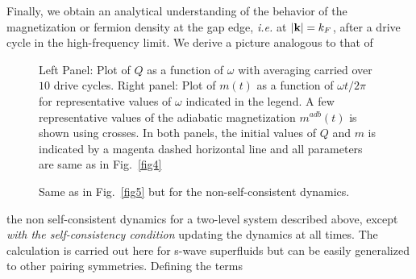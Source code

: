 \documentclass[a4paper,10pt]{report}
\begin{document}
Finally, we obtain an analytical understanding of the
behavior of the magnetization or fermion density at the gap edge,
{\it i.e.} at $|{\bf k}|= k_F$, after a drive cycle in the
high-frequency limit. We derive a picture analogous to that of 
\begin{figure}
\begin{center}
\end{center}
\caption{  Left Panel: Plot of $Q$ as a function of
$\omega$ with averaging carried over $10$ drive cycles. Right panel:
Plot of $m(t)$ as a function of $\omega t/2\pi$ for representative
values of $\omega$ indicated in the legend. A few representative
values of the adiabatic magnetization $m^{adb}(t)$ is shown using
crosses. In both panels, the initial values of $Q$ and $m$ is
indicated by a magenta dashed horizontal line and all parameters are
same as in Fig.\ \ref{fig4}} \label{fig5}
\begin{center}
\end{center}
\caption{  Same as in Fig.\ \ref{fig5} but for the
non-self-consistent dynamics.} \label{fig6}
\end{figure}
the non self-consistent dynamics for a two-level
system described above, except {\it with the self-consistency condition} updating the dynamics at all times. The calculation
is carried out here for s-wave superfluids but can be easily
generalized to other pairing symmetries. Defining the terms
\end{document}

